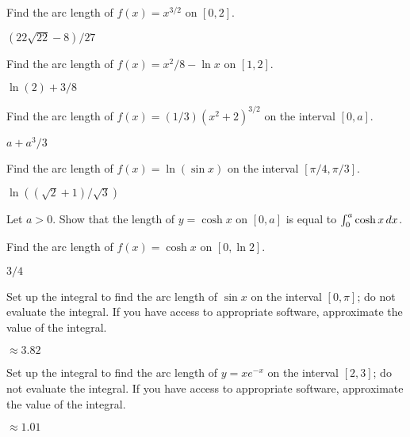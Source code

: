 \begin{exercises}

\begin{exercise} Find the arc length of $f(x)=x^{3/2}$ on $[0,2]$.
\begin{answer} $(22\sqrt{22}-8)/27$
\end{answer}\end{exercise}

\begin{exercise} Find the arc length of $f(x) = x^2/8-\ln x$
on $[1,2]$.
\begin{answer} $\ln(2)+3/8$
\end{answer}\end{exercise}

\begin{exercise}
Find the arc length of $f(x) = (1/3)(x^2 +2)^{3/2}$
on the interval $[0,a]$.
\begin{answer} $a+a^3/3$
\end{answer}\end{exercise}

\begin{exercise} Find the arc length of $f(x)=\ln(\sin x)$ on the
interval $[\pi/4,\pi/3]$.
\begin{answer} $\ln((\sqrt2+1)/\sqrt3)$
\end{answer}\end{exercise}

\begin{exercise} Let $a>0$. Show that the length of $y=\cosh x$ on
$[0,a]$ is equal to $\int _0 ^a \cosh x\, d x$.
\end{exercise}

\begin{exercise} Find the arc length of $f(x)=\cosh x$ on $[0, \ln 2]$.
\begin{answer} $3/4$
\end{answer}\end{exercise}

\begin{exercise} Set up the integral to find the arc length of $\sin x$ 
on the interval $[0,\pi]$; do not evaluate the integral. If you have
access to appropriate software, approximate the value of the integral.
\begin{answer} $\approx 3.82$
\end{answer}\end{exercise}

\begin{exercise} Set up the integral to find the arc length of $y=x e^{-x}$
on the interval $[2,3]$; do not evaluate the integral. If you have
access to appropriate software, approximate the value of the integral.
\begin{answer} $\approx 1.01$
\end{answer}\end{exercise}


\end{exercises}
